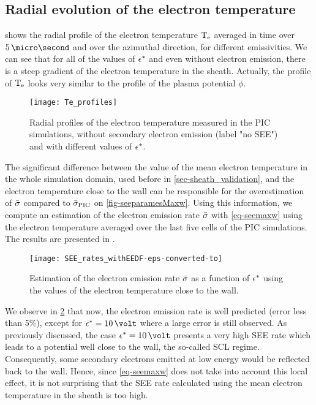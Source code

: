    \subsection{Radial evolution of the electron temperature}
     \label{subsec-Radial_Te}
     
      shows the radial profile of the electron temperature $\mathrm{T_e}$ averaged in time over $5\,\micro\second$ and over the azimuthal direction, for different emissivities.
     We can see that for all of the values of $\epsilon^{*}$ and even without electron emission, there is a steep gradient of the electron temperature in the sheath.
     Actually, the profile of $\mathrm{T_e}$ looks very similar to the profile of the plasma potential $\phi$.
   
   \begin{figure}[!hbt]
     \centering
     \texttt{[image: Te\_profiles]}
     \caption{Radial profiles of the electron temperature measured in the \acs{PIC} simulations, without secondary electron emission (label "no SEE") and with different values of $\epsilon^{*}$.}
     \label{fig-te_profile_see}
   \end{figure}

   The significant difference between the value of the mean electron temperature in the whole simulation domain, used before in \cref{sec-sheath_validation}, and the electron temperature close to the wall can be responsible for the overestimation of $ \bar{\sigma }$ compared to $ \bar{\sigma }_{\rm PIC}$ on \cref{fig-seeparamesMaxw}.
   Using this information, we compute an estimation of the electron emission rate $ \bar{\sigma }$ with \cref{eq-seemaxw} using the electron temperature averaged over the last five cells of the PIC simulations.
   The results are presented in .
   
   \begin{figure}[!hbt]
     \centering
     \texttt{[image: SEE\_rates\_withEEDF-eps-converted-to]}
     \caption{Estimation of the electron emission rate $ \bar{\sigma }$ as a function of $\epsilon^{*}$ using the values of the electron temperature close to the wall.}
     \label{fig-rate_pic_wall}
   \end{figure}
   
   We observe in \cref{fig-rate_pic_wall} that now, the electron emission rate is well predicted (error less than 5\%), except for $\crover=10\,\volt$ where a large error is still observed.
   As previously discussed, the case $\crover=10\,\volt$ presents a very high SEE rate which leads to a potential well close to the wall, the so-called \ac{SCL} regime.
   Consequently, some secondary electrons emitted at low energy would be reflected back to the wall.
   Hence, since \cref{eq-seemaxw} does not take into account this local effect, it is not surprising that the SEE rate calculated using the mean electron temperature in the sheath is too high.

